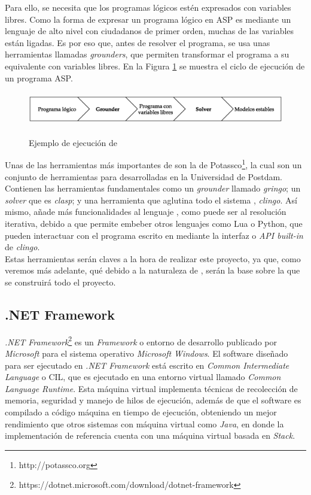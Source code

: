 Para ello, se necesita que los programas lógicos estén expresados con variables libres. Como la forma de expresar un programa lógico en ASP es mediante un lenguaje de alto nivel con ciudadanos de primer orden, muchas de las variables están ligadas. Es por eso que, antes de resolver el programa, se usa unas herramientas llamadas \textit{grounders}, que permiten transformar el programa a su equivalente con variables libres. En la Figura \ref{fig:asp} se muestra el ciclo de ejecución de un programa ASP. \\

\begin{figure}[h]
	\centering
	\includegraphics[height=4em]{images/ASP}
	\label{fig:asp}
	\caption{Ejemplo de ejecución de \asp}
\end{figure}

Unas de las herramientas más importantes de \asp son la de Potassco\footnote{http://potassco.org}, la cual son un conjunto de herramientas para \asp desarrolladas en la Universidad de Postdam. Contienen las herramientas fundamentales como un \textit{grounder} llamado \textit{gringo}; un \textit{solver} que es \textit{clasp}; y una herramienta que aglutina todo el sistema \asp, \textit{clingo}. Así mismo, añade más funcionalidades al lenguaje \asp, como puede ser al resolución iterativa, debido a que permite embeber otros lenguajes como Lua o Python, que pueden interactuar con el programa escrito en \asp mediante la interfaz o \textit{API built-in} de \textit{clingo}. \\

Estas herramientas serán claves a la hora de realizar este proyecto, ya que, como veremos más adelante, qué debido a la naturaleza de \asp, serán la base sobre la que se construirá todo el proyecto.

\subsection{.NET Framework}

\textit{.NET Framework}\footnote{https://dotnet.microsoft.com/download/dotnet-framework} es un \textit{Framework} o entorno de desarrollo publicado por \textit{Microsoft} para el sistema operativo \textit{Microsoft Windows}. El software diseñado para ser ejecutado en \textit{.NET Framework} está escrito en \textit{Common Intermediate Language} o CIL, que es ejecutado en una entorno virtual llamado \textit{Common Language Runtime}. Esta máquina virtual implementa técnicas de recolección de memoria, seguridad y manejo de hilos de ejecución, además de que el software es compilado a código máquina en tiempo de ejecución, obteniendo un mejor rendimiento que otros sistemas con máquina virtual como \textit{Java}, en donde la implementación de referencia cuenta con una máquina virtual basada en \textit{Stack}.\\

